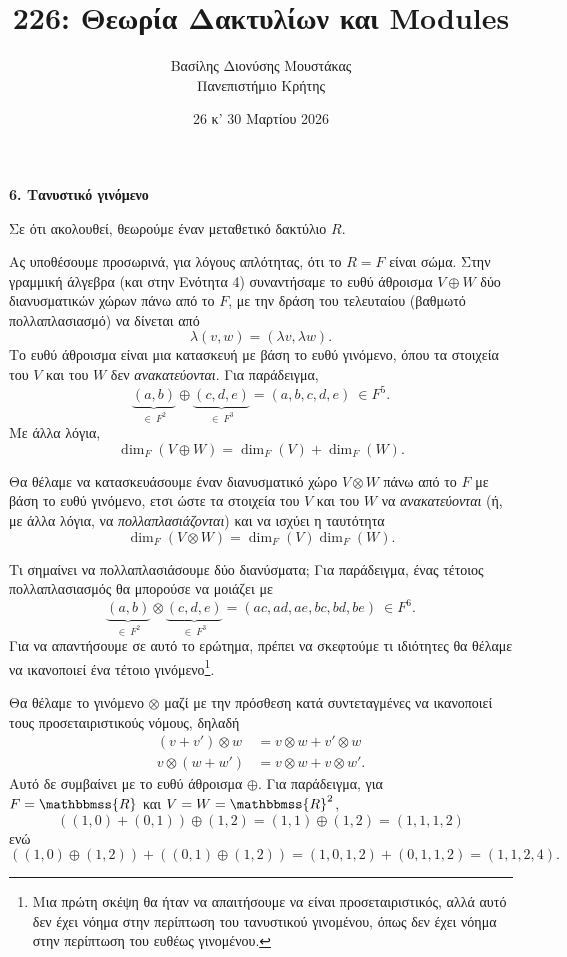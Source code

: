 \documentclass[12pt,a4paper,reqno]{amsart}
\title{226: Θεωρία Δακτυλίων και Modules}
\author[Β.~Δ. Μουστακας]{Βασίλης Διονύσης Μουστάκας \\ Πανεπιστήμιο Κρήτης}
\date{26 κ' 30 Μαρτίου 2026}
\theoremstyle{definition}
\theoremstyle{remark}
\numberwithin{theorem}{section}
\numberwithin{exercise}{section}
\numberwithin{equation}{section}
\newcommand{\RR}{\mathbbmss{R}}
\begin{document}
\begingroup
\def\uppercasenonmath#1{} %
\let\MakeUppercase\relax %
\maketitle
\endgroup

\setcounter{section}{6}
\begin{center}
    \textbf{6. Τανυστικό γινόμενο
}
\end{center}

Σε ότι ακολουθεί, θεωρούμε έναν μεταθετικό δακτύλιο $R$.

Ας υποθέσουμε προσωρινά, για λόγους απλότητας, ότι το $R = F$ είναι σώμα. Στην γραμμική άλγεβρα (και στην Ενότητα 4) συναντήσαμε το ευθύ άθροισμα $V \oplus W$ δύο διανυσματικών χώρων πάνω από το $F$, με την δράση του τελευταίου (βαθμωτό πολλαπλασιασμό) να δίνεται από 
\[
\lambda (v, w) = (\lambda{v}, \lambda{w}).
\]
Το ευθύ άθροισμα είναι μια κατασκευή με βάση το ευθύ γινόμενο, όπου τα στοιχεία του $V$ και του $W$ δεν \emph{ανακατεύονται}. Για παράδειγμα, 
\[
\underbrace{(a,b)}_{\in \ F^2} \oplus 
\underbrace{(c,d,e)}_{\in \ F^3} =
(a,b,c,d,e) \ \in F^5.
\]
Με άλλα λόγια, 
\[
\dim_F(V \oplus W) = \dim_F(V) + \dim_F(W).
\]

Θα θέλαμε να κατασκευάσουμε έναν διανυσματικό χώρο $V \otimes W$ πάνω από το $F$ με βάση το ευθύ γινόμενο, ετσι ώστε τα στοιχεία του $V$ και του $W$ να \emph{ανακατεύονται} (ή, με άλλα λόγια, να \emph{πολλαπλασιάζονται}) και να ισχύει η ταυτότητα 
\[
\dim_F(V\otimes{W}) = \dim_F(V)\dim_F(W).
\]

Τι σημαίνει να πολλαπλασιάσουμε δύο διανύσματα; Για παράδειγμα, ένας τέτοιος πολλαπλασιασμός θα μπορούσε να μοιάζει με 
\[
\underbrace{(a,b)}_{\in \ F^2} \otimes
\underbrace{(c,d,e)}_{\in \ F^3} =
(ac,ad,ae,bc,bd,be) \ \in F^6.
\]
Για να απαντήσουμε σε αυτό το ερώτημα, πρέπει να σκεφτούμε τι ιδιότητες θα θέλαμε να ικανοποιεί ένα τέτοιο γινόμενο\footnote{Μια πρώτη σκέψη θα ήταν να απαιτήσουμε να είναι προσεταιριστικός, αλλά αυτό δεν έχει νόημα στην περίπτωση του τανυστικού γινομένου, όπως δεν έχει νόημα στην περίπτωση του ευθέως γινομένου.}.  

Θα θέλαμε το γινόμενο $\otimes$ μαζί με την πρόσθεση κατά συντεταγμένες να ικανοποιεί τους προσεταιριστικούς νόμους, δηλαδή
\begin{align*}
    (v + v') \otimes w &= v\otimes w + v' \otimes w \\
    v \otimes (w+w') &= v\otimes w + v \otimes w'.
\end{align*}
Αυτό δε συμβαίνει με το ευθύ άθροισμα $\oplus$. Για παράδειγμα, για $F = \RR$ και $V = W = \RR^2$,
\[
\left((1,0) + (0,1)\right) \oplus (1,2) = (1,1) \oplus (1,2) = (1,1,1,2)
\]
ενώ 
\[
\left((1,0) \oplus (1,2)\right) +
\left((0,1) \oplus (1,2)\right) = (1,0,1,2) + (0,1,1,2) = (1,1,2,4).
\]
\end{document}
